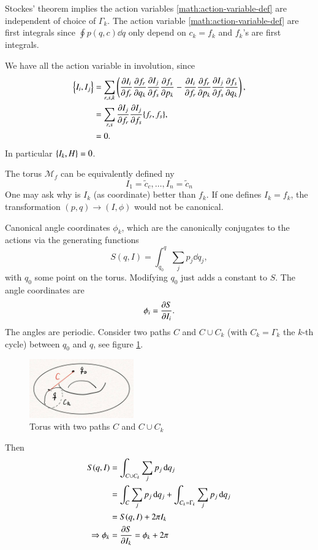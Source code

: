 Stockes' theorem implies the action variables \eqref{math:action-variable-def} are independent of choice of $\Gamma_k$. The action variable \eqref{math:action-variable-def} are first integrals since $\oint p(q, c) \dd{q}$ only depend on $c_k = f_k$ and $f_k$'s are first integrals.

We have all the action variable in involution, since
\begin{align*}
	\pb{I_i}{I_j} &= \sum_{r, s, k} \left( \pdv{I_i}{f_r} \pdv{f_r}{q_k} \pdv{I_j}{f_s} \pdv{f_s}{p_k} - \pdv{I_i}{f_r} \pdv{f_r}{p_k} \pdv{I_j}{f_s} \pdv{f_s}{q_k} \right),  \\
					  &= \sum_{r,s} \pdv{I_j}{f_r} \pdv{I_j}{f_s} \pb{f_r}{f_s}, \\
					  &=0.
	\label{eq:}
\end{align*}
In particular $\pb{I_k}{H}=0$. 

The torus $\mathcal{M}_f$ can be equivalently defined ny 
\begin{equation*}
	I_1 = \tilde{c}_c, 	\dots, I_n = \tilde{c}_n
\end{equation*}
One may ask why is $I_k$ (as coordinate) better than $f_k$. If one defines $I_k = f_k$, the transformation $(p, q) \rightarrow (I, \phi)$ would not be canonical. 

Canonical angle coordinates $\phi_k$, which are the canonically conjugates to the actions via the generating functions
\begin{equation}
	S(q, I) = \int_{q_0}^{q} \sum_j p_j \dd{q_j},
\end{equation}
with $q_0$ some point on the torus. Modifying $q_0$ just adds a constant to $S$. The angle coordinates are
\begin{equation*}
	\phi_i = \pdv{S}{I_i}.
\end{equation*}
The angles are periodic. Consider two paths $C$ and $C \cup C_k$ (with $C_k = \Gamma_k$ the $k$-th cycle) between $q_0$ and $q$, see figure \ref{fig:torus-angle}.
\begin{figure}[ht]
	\centering
	\includegraphics[width=0.4\textwidth]{./figs/torus-angle.jpg}
	\caption{Torus with two paths $C$ and $C\cup C_k$}
	\label{fig:torus-angle}
\end{figure}
Then
\begin{align*}
	S(q, I) &= \int_{C\cup C_k} \sum_j p_j \dd{q_j} \\
			  &= \int_{C} \sum_j p_j \dd{q_j} + \int_{C_k = \Gamma_k} \sum_j p_j \dd{q_j} \\
			  &= S(q, I) + 2\pi I_k \\
	\Rightarrow \phi_k &= \pdv{S}{I_k} = \phi_k + 2\pi
	\label{eq:}
\end{align*}

